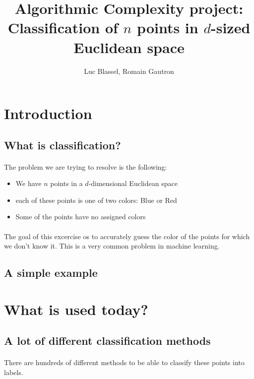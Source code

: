 \documentclass[11 pt]{article}
\title{Algorithmic Complexity project:\\ Classification of $n$ points in $d$-sized Euclidean space}
\author{Luc Blassel, Romain Gautron}
\begin{document}
\maketitle

\section{Introduction}
\subsection{What is classification?}
\paragraph{}The problem we are trying to resolve is the following:
\begin{itemize}
  \item We have $n$ points in a $d$-dimensional Euclidean space
  \item each of these points is one of two colors: Blue or Red
  \item Some of the points have no assigned colors
\end{itemize}
\paragraph{}The goal of this excercise os to accurately guess the color of the points for which we don't know it. This is a very common problem in machine learning.

\subsection{A simple example}
\paragraph{}


\section{What is used today?}
\subsection{A lot of different classification methods}
\paragraph{}There are hundreds of different methods to be able to classify these points into labels.
\end{document}
